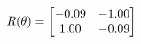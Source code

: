 \documentclass[preview]{standalone}
\begin{document}
\begin{align*}
\special{dvisvgm:raw <g id='unique000'>}R(\theta) = \begin{bmatrix}-0.09 & -1.00\\1.00 & -0.09\end{bmatrix}\special{dvisvgm:raw </g>}
\end{align*}
\end{document}
